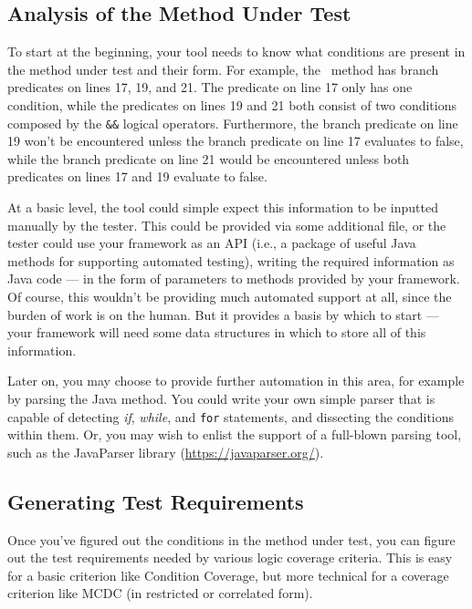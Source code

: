 \subsection{Analysis of the Method Under Test}

To start at the beginning, your tool needs to know what conditions are present
in the method under test and their form. For example, the
\calculatemethod~method has branch predicates on lines 17, 19, and 21. The
predicate on line 17 only has one condition, while the predicates on lines 19
and 21 both consist of two conditions composed by the {\tt \&\&} logical
operators. Furthermore, the branch predicate on line 19 won't be encountered
unless the branch predicate on line 17 evaluates to false, while the branch
predicate on line 21 would be encountered unless both predicates on lines 17 and
19 evaluate to false.

At a basic level, the tool could simple expect this information to be inputted
manually by the tester. This could be provided via some additional file, or the
tester could use your framework as an API (i.e., a package of useful Java
methods for supporting automated testing), writing the required information as
Java code --- in the form of parameters to methods provided by your framework. 
%
Of course, this wouldn't be providing much automated support at all, since the
burden of work is on the human. But it provides a basis by which to start ---
your framework will need some data structures in which to store all of this
information. 

Later on, you may choose to provide further automation in this area, for example
by parsing the Java method. You could write your own simple parser that is
capable of detecting {\it if}, {\it while}, and {\tt for} statements, and
dissecting the conditions within them.
%
Or, you may wish to enlist the support of a full-blown parsing tool, such as the
JavaParser library (\url{https://javaparser.org/}).

\subsection{Generating Test Requirements}

Once you've figured out the conditions in the method under test, you can figure
out the test requirements needed by various logic coverage criteria. This is
easy for a basic criterion like Condition Coverage, but more technical for a
coverage criterion like MCDC (in restricted or correlated form). 

